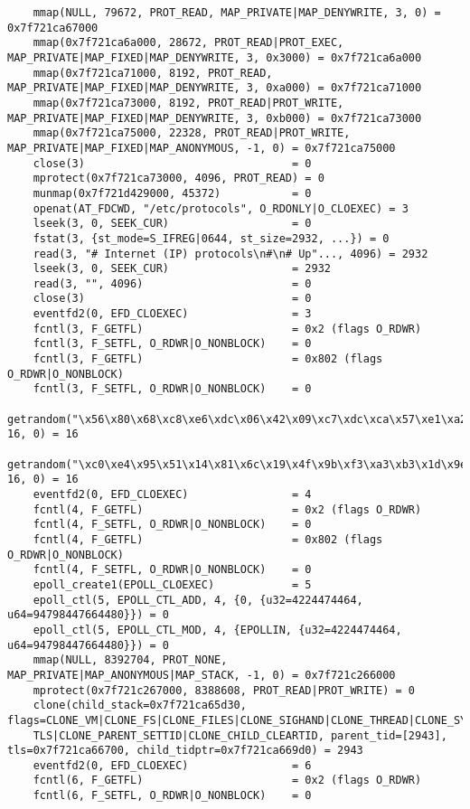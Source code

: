 \documentclass[pdf, unicode, 12pt, a4paper,oneside,fleqn]{article}
\begin{document}
{\begin{verbatim}
    mmap(NULL, 79672, PROT_READ, MAP_PRIVATE|MAP_DENYWRITE, 3, 0) = 0x7f721ca67000
    mmap(0x7f721ca6a000, 28672, PROT_READ|PROT_EXEC, MAP_PRIVATE|MAP_FIXED|MAP_DENYWRITE, 3, 0x3000) = 0x7f721ca6a000
    mmap(0x7f721ca71000, 8192, PROT_READ, MAP_PRIVATE|MAP_FIXED|MAP_DENYWRITE, 3, 0xa000) = 0x7f721ca71000
    mmap(0x7f721ca73000, 8192, PROT_READ|PROT_WRITE, MAP_PRIVATE|MAP_FIXED|MAP_DENYWRITE, 3, 0xb000) = 0x7f721ca73000
    mmap(0x7f721ca75000, 22328, PROT_READ|PROT_WRITE, MAP_PRIVATE|MAP_FIXED|MAP_ANONYMOUS, -1, 0) = 0x7f721ca75000
    close(3)                                = 0
    mprotect(0x7f721ca73000, 4096, PROT_READ) = 0
    munmap(0x7f721d429000, 45372)           = 0
    openat(AT_FDCWD, "/etc/protocols", O_RDONLY|O_CLOEXEC) = 3
    lseek(3, 0, SEEK_CUR)                   = 0
    fstat(3, {st_mode=S_IFREG|0644, st_size=2932, ...}) = 0
    read(3, "# Internet (IP) protocols\n#\n# Up"..., 4096) = 2932
    lseek(3, 0, SEEK_CUR)                   = 2932
    read(3, "", 4096)                       = 0
    close(3)                                = 0
    eventfd2(0, EFD_CLOEXEC)                = 3
    fcntl(3, F_GETFL)                       = 0x2 (flags O_RDWR)
    fcntl(3, F_SETFL, O_RDWR|O_NONBLOCK)    = 0
    fcntl(3, F_GETFL)                       = 0x802 (flags O_RDWR|O_NONBLOCK)
    fcntl(3, F_SETFL, O_RDWR|O_NONBLOCK)    = 0
    getrandom("\x56\x80\x68\xc8\xe6\xdc\x06\x42\x09\xc7\xdc\xca\x57\xe1\xa2\x7d", 16, 0) = 16
    getrandom("\xc0\xe4\x95\x51\x14\x81\x6c\x19\x4f\x9b\xf3\xa3\xb3\x1d\x9e\x7a", 16, 0) = 16
    eventfd2(0, EFD_CLOEXEC)                = 4
    fcntl(4, F_GETFL)                       = 0x2 (flags O_RDWR)
    fcntl(4, F_SETFL, O_RDWR|O_NONBLOCK)    = 0
    fcntl(4, F_GETFL)                       = 0x802 (flags O_RDWR|O_NONBLOCK)
    fcntl(4, F_SETFL, O_RDWR|O_NONBLOCK)    = 0
    epoll_create1(EPOLL_CLOEXEC)            = 5
    epoll_ctl(5, EPOLL_CTL_ADD, 4, {0, {u32=4224474464, u64=94798447664480}}) = 0
    epoll_ctl(5, EPOLL_CTL_MOD, 4, {EPOLLIN, {u32=4224474464, u64=94798447664480}}) = 0
    mmap(NULL, 8392704, PROT_NONE, MAP_PRIVATE|MAP_ANONYMOUS|MAP_STACK, -1, 0) = 0x7f721c266000
    mprotect(0x7f721c267000, 8388608, PROT_READ|PROT_WRITE) = 0
    clone(child_stack=0x7f721ca65d30, flags=CLONE_VM|CLONE_FS|CLONE_FILES|CLONE_SIGHAND|CLONE_THREAD|CLONE_SYSVSEM|CLONE_SET
    TLS|CLONE_PARENT_SETTID|CLONE_CHILD_CLEARTID, parent_tid=[2943], tls=0x7f721ca66700, child_tidptr=0x7f721ca669d0) = 2943
    eventfd2(0, EFD_CLOEXEC)                = 6
    fcntl(6, F_GETFL)                       = 0x2 (flags O_RDWR)
    fcntl(6, F_SETFL, O_RDWR|O_NONBLOCK)    = 0

\end{verbatim}}
\end{document}
